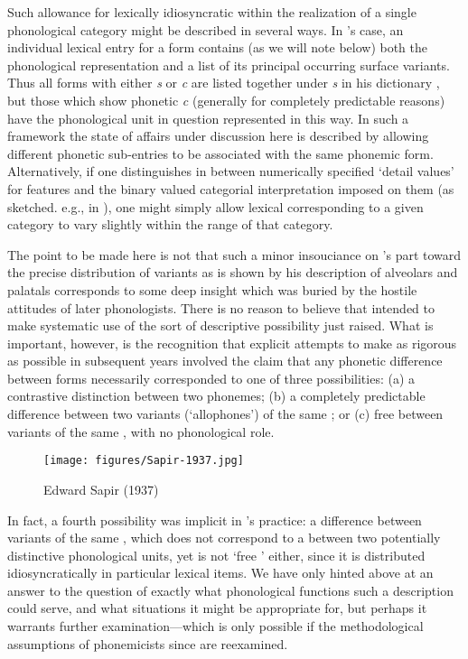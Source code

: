 Such allowance for lexically idiosyncratic  within the
realization of a single phonological category might be described in
several ways. In {\Sapir}'s case, an individual lexical entry for a form
contains (as we will note below) both the phonological representation
and a list of its principal occurring surface variants. Thus all forms
with either \emph{s} or \emph{c} are listed together under \emph{s} in
his  dictionary \citep{sapir31:s.paiute.dict}, but
those which show phonetic \emph{c} (generally for completely
predictable reasons) have the phonological unit in question
represented in this way. In such a framework the state of affairs
under discussion here is described by allowing different phonetic
sub-entries to be associated with the same phonemic
form. Alternatively, if one distinguishes in  between
numerically specified `detail values' for features and the binary
valued categorial interpretation imposed on them (as sketched. e.g.,
in \citealt{sra74:orgphon}), one might simply allow lexical
 corresponding to a given category to vary slightly
within the range of that category.

The point to be made here is not that such a minor insouciance on
{\Sapir}'s part toward the precise distribution of variants as is shown
by his description of  alveolars and palatals
corresponds to some deep insight which was buried by the hostile
attitudes of later phonologists. There is no reason to believe that
{\Sapir} intended to make systematic use of the sort of descriptive
possibility just raised. What is important, however, is the
recognition that explicit attempts to make  as rigorous
as possible in subsequent years involved the claim that any phonetic
difference between forms necessarily corresponded to one of three
possibilities: (a) a contrastive distinction between two phonemes; (b)
a completely predictable difference between two variants
(`allophones') of the same ; or (c) free  between
variants of the same , with no phonological role.

\begin{wrapfigure}{r}{.4\textwidth}
  \texttt{[image: figures/Sapir-1937.jpg]}
  \caption{Edward Sapir (1937)}
  \label{fig:ch.sapir.sapir_1937}
\end{wrapfigure}
In fact, a fourth possibility was implicit in {\Sapir}'s practice: a
difference between variants of the same , which does not
correspond to a  between two potentially distinctive
phonological units, yet is not `free ' either, since it is
distributed idiosyncratically in particular lexical items. We have
only hinted above at an answer to the question of exactly what
phonological functions such a description could serve, and what
situations it might be appropriate for, but perhaps it warrants
further examination—which is only possible if the methodological
assumptions of phonemicists since {\Sapir} are reexamined.\\

